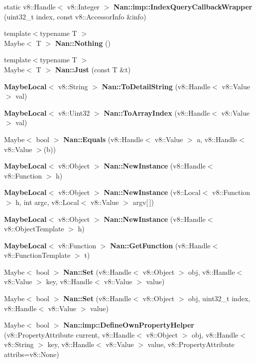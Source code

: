 \begin{DoxyCompactItemize}
\item 
static v8\+::\+Handle$<$ v8\+::\+Integer $>$ \textbf{ Nan\+::imp\+::\+Index\+Query\+Callback\+Wrapper} (uint32\+\_\+t index, const v8\+::\+Accessor\+Info \&info)
\item 
{\footnotesize template$<$typename T $>$ }\\Maybe$<$ T $>$ \textbf{ Nan\+::\+Nothing} ()
\item 
{\footnotesize template$<$typename T $>$ }\\Maybe$<$ T $>$ \textbf{ Nan\+::\+Just} (const T \&t)
\item 
\textbf{ Maybe\+Local}$<$ v8\+::\+String $>$ \textbf{ Nan\+::\+To\+Detail\+String} (v8\+::\+Handle$<$ v8\+::\+Value $>$ val)
\item 
\textbf{ Maybe\+Local}$<$ v8\+::\+Uint32 $>$ \textbf{ Nan\+::\+To\+Array\+Index} (v8\+::\+Handle$<$ v8\+::\+Value $>$ val)
\item 
Maybe$<$ bool $>$ \textbf{ Nan\+::\+Equals} (v8\+::\+Handle$<$ v8\+::\+Value $>$ a, v8\+::\+Handle$<$ v8\+::\+Value $>$(b))
\item 
\textbf{ Maybe\+Local}$<$ v8\+::\+Object $>$ \textbf{ Nan\+::\+New\+Instance} (v8\+::\+Handle$<$ v8\+::\+Function $>$ h)
\item 
\textbf{ Maybe\+Local}$<$ v8\+::\+Object $>$ \textbf{ Nan\+::\+New\+Instance} (v8\+::\+Local$<$ v8\+::\+Function $>$ h, int argc, v8\+::\+Local$<$ v8\+::\+Value $>$ argv[$\,$])
\item 
\textbf{ Maybe\+Local}$<$ v8\+::\+Object $>$ \textbf{ Nan\+::\+New\+Instance} (v8\+::\+Handle$<$ v8\+::\+Object\+Template $>$ h)
\item 
\textbf{ Maybe\+Local}$<$ v8\+::\+Function $>$ \textbf{ Nan\+::\+Get\+Function} (v8\+::\+Handle$<$ v8\+::\+Function\+Template $>$ t)
\item 
Maybe$<$ bool $>$ \textbf{ Nan\+::\+Set} (v8\+::\+Handle$<$ v8\+::\+Object $>$ obj, v8\+::\+Handle$<$ v8\+::\+Value $>$ key, v8\+::\+Handle$<$ v8\+::\+Value $>$ value)
\item 
Maybe$<$ bool $>$ \textbf{ Nan\+::\+Set} (v8\+::\+Handle$<$ v8\+::\+Object $>$ obj, uint32\+\_\+t index, v8\+::\+Handle$<$ v8\+::\+Value $>$ value)
\item 
Maybe$<$ bool $>$ \textbf{ Nan\+::imp\+::\+Define\+Own\+Property\+Helper} (v8\+::\+Property\+Attribute current, v8\+::\+Handle$<$ v8\+::\+Object $>$ obj, v8\+::\+Handle$<$ v8\+::\+String $>$ key, v8\+::\+Handle$<$ v8\+::\+Value $>$ value, v8\+::\+Property\+Attribute attribs=v8\+::\+None)
\item 

\end{DoxyCompactItemize}
